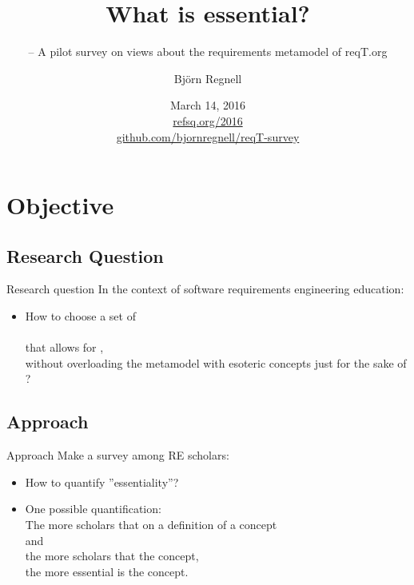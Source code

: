 \documentclass{slides}
\title[What is essential?]{What is essential?}
\subtitle{\footnotesize -- A pilot survey on views about the requirements metamodel of reqT.org}
\author{Björn Regnell}
\institute{Lund University}
\date{March 14, 2016\\ \href{http://refsq.org/2016}{refsq.org/2016}\\ \href{https://github.com/bjornregnell/reqT-survey}{github.com/bjornregnell/reqT-survey}}
\begin{document}
\frame{\titlepage}
\frame{\tableofcontents}

\section{Objective}
\subsection{Research Question}
\begin{Slide}{Research question}
In the context of software requirements engineering education:
\begin{itemize}
\item How to choose a set of \\  \\ that allows for , \\ without overloading the metamodel with esoteric concepts just for the sake of ?
\end{itemize}
\end{Slide}
\subsection{Approach}
\begin{Slide}{Approach}
Make a survey among RE scholars:
\begin{itemize}
\item How to quantify ''essentiality''?
\pause
\item One possible quantification: \\ The more scholars that  on a definition of a concept \\ and \\ the more scholars that  the concept, \\ the more essential is the concept.
\end{itemize}
\end{Slide}
\end{document}
